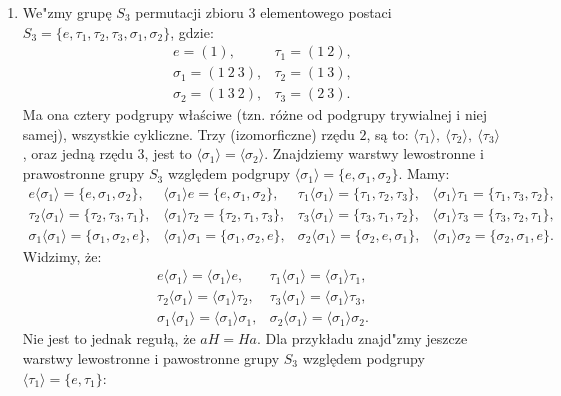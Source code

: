 \begin{przyk}
\begin{enumerate}[\rm(1)]
\item
We"zmy grupę $S_3$ permutacji zbioru $3$ elementowego postaci $S_3=\{e,\tau_1,\tau_2,\tau_3,\sigma_1,\sigma_2\}$, gdzie:
$$\begin{array}{ll}
e=(1), & \tau_1=(1\ 2),\\
\sigma_1=(1\ 2\ 3), & \tau_2=(1\ 3),\\
\sigma_2=(1\ 3\ 2), & \tau_3=(2\ 3).
\end{array}$$
Ma ona cztery podgrupy właściwe (tzn. różne od podgrupy trywialnej i niej samej), wszystkie cykliczne. Trzy (izomorficzne) rzędu $2$, są to: $\langle\tau_1\rangle,\ \langle\tau_2\rangle,\ \langle\tau_3\rangle$, oraz jedną rzędu $3$, jest to $\langle\sigma_1\rangle=\langle\sigma_2\rangle$. Znajdziemy warstwy lewostronne i prawostronne grupy $S_3$ względem podgrupy $\langle\sigma_1\rangle=\{e,\sigma_1,\sigma_2\}$. Mamy:
$$\begin{array}{llll}
e\langle\sigma_1\rangle=\{e,\sigma_1,\sigma_2\}, & \langle\sigma_1\rangle e=\{e,\sigma_1,\sigma_2\}, & \tau_1\langle\sigma_1\rangle=\{\tau_1,\tau_2,\tau_3\}, & \langle\sigma_1\rangle\tau_1=\{\tau_1,\tau_3,\tau_2\},\\
\tau_2\langle\sigma_1\rangle=\{\tau_2,\tau_3,\tau_1\}, & \langle\sigma_1\rangle\tau_2=\{\tau_2,\tau_1,\tau_3\}, & \tau_3\langle\sigma_1\rangle=\{\tau_3,\tau_1,\tau_2\}, & \langle\sigma_1\rangle\tau_3=\{\tau_3,\tau_2,\tau_1\},\\
\sigma_1\langle\sigma_1\rangle=\{\sigma_1,\sigma_2,e\}, & \langle\sigma_1\rangle\sigma_1=\{\sigma_1,\sigma_2,e\}, & \sigma_2\langle\sigma_1\rangle=\{\sigma_2,e,\sigma_1\}, & \langle\sigma_1\rangle\sigma_2=\{\sigma_2,\sigma_1,e\}.
\end{array}$$
Widzimy, że:
$$\begin{array}{ll}
e\langle\sigma_1\rangle=\langle\sigma_1\rangle e, & \tau_1\langle\sigma_1\rangle=\langle\sigma_1\rangle\tau_1,\\
\tau_2\langle\sigma_1\rangle=\langle\sigma_1\rangle\tau_2, & \tau_3\langle\sigma_1\rangle=\langle\sigma_1\rangle\tau_3,\\
\sigma_1\langle\sigma_1\rangle=\langle\sigma_1\rangle\sigma_1, & \sigma_2\langle\sigma_1\rangle=\langle\sigma_1\rangle\sigma_2.
\end{array}$$
Nie jest to jednak regułą, że $aH=Ha$. Dla przykładu znajd"zmy jeszcze warstwy lewostronne i pawostronne grupy $S_3$ względem podgrupy $\langle\tau_1\rangle=\{e,\tau_1\}$:

\end{enumerate}
\end{przyk}

